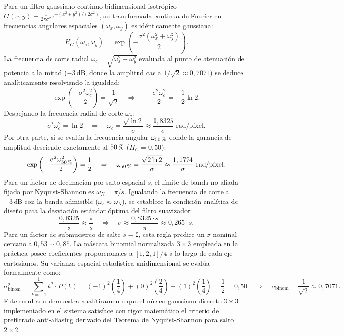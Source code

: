 \documentclass[11pt]{article}
\newcommand{\pct}{\ensuremath{\mathrm{\char37}}}
\begin{document}
Para un filtro gaussiano continuo bidimensional isotrópico $G(x, y) = \frac{1}{2\pi\sigma^2} e^{-(x^2+y^2)/(2\sigma^2)}$, su transformada continua de Fourier en frecuencias angulares espaciales $(\omega_x, \omega_y)$ es idénticamente gaussiana:
\begin{equation}
H_G(\omega_x, \omega_y) = \exp\left( -\frac{\sigma^2 (\omega_x^2 + \omega_y^2)}{2} \right).
\end{equation}
La frecuencia de corte radial $\omega_c = \sqrt{\omega_x^2 + \omega_y^2}$ evaluada al punto de atenuación de potencia a la mitad ($-3\,\text{dB}$, donde la amplitud cae a $1/\sqrt{2} \approx 0,7071$) se deduce analíticamente resolviendo la igualdad:
\begin{equation}
\exp\left( -\frac{\sigma^2 \omega_c^2}{2} \right) = \frac{1}{\sqrt{2}} \quad\Rightarrow\quad -\frac{\sigma^2 \omega_c^2}{2} = -\frac{1}{2}\ln 2.
\end{equation}
Despejando la frecuencia radial de corte $\omega_c$:
\begin{equation}
\sigma^2 \omega_c^2 = \ln 2 \quad\Rightarrow\quad \omega_c = \frac{\sqrt{\ln 2}}{\sigma} \approx \frac{0,8325}{\sigma} \text{ rad/píxel}.
\end{equation}
Por otra parte, si se evalúa la frecuencia angular $\omega_{50\,\pct}$ donde la ganancia de amplitud desciende exactamente al $50\,\pct$ ($H_G = 0,50$):
\begin{equation}
\exp\left( -\frac{\sigma^2 \omega_{50\,\pct}^2}{2} \right) = \frac{1}{2} \quad\Rightarrow\quad \omega_{50\,\pct} = \frac{\sqrt{2\ln 2}}{\sigma} \approx \frac{1,1774}{\sigma} \text{ rad/píxel}.
\end{equation}
Para un factor de decimación por salto espacial $s$, el límite de banda no aliada fijado por Nyquist-Shannon es $\omega_N = \pi / s$. Igualando la frecuencia de corte a $-3\,\text{dB}$ con la banda admisible ($\omega_c \approx \omega_N$), se establece la condición analítica de diseño para la desviación estándar óptima del filtro suavizador:
\begin{equation}
\frac{0,8325}{\sigma} \approx \frac{\pi}{s} \quad\Rightarrow\quad \sigma \approx \frac{0,8325 \cdot s}{\pi} \approx 0,265 \cdot s.
\end{equation}
Para un factor de submuestreo de salto $s=2$, esta regla predice un $\sigma$ nominal cercano a $0,53 \sim 0,85$. La máscara binomial normalizada $3\times3$ empleada en la práctica posee coeficientes proporcionales a $[1, 2, 1]/4$ a lo largo de cada eje cartesianos. Su varianza espacial estadística unidimensional se evalúa formalmente como:
\begin{equation}
\sigma_{\text{binom}}^2 = \sum_{k=-1}^{1} k^2 \cdot P(k) = (-1)^2\left(\frac{1}{4}\right) + (0)^2\left(\frac{2}{4}\right) + (1)^2\left(\frac{1}{4}\right) = \frac{1}{2} = 0,50 \quad\Rightarrow\quad \sigma_{\text{binom}} = \frac{1}{\sqrt{2}} \approx 0,7071.
\end{equation}
Este resultado demuestra analíticamente que el núcleo gaussiano discreto $3\times3$ implementado en el sistema satisface con rigor matemático el criterio de prefiltrado anti-aliasing derivado del Teorema de Nyquist-Shannon para salto $2\times2$.
\end{document}
